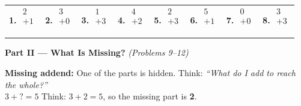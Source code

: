 \documentclass[12pt, letterpaper]{article}
\begin{document}
\noindent
\begin{tabular}{@{}p{1.8cm} p{1.8cm} p{1.8cm} p{1.8cm} p{1.8cm} p{1.8cm} p{1.8cm} p{1.8cm}@{}}

\textbf{1.}
$\begin{array}{r} 2 \\ +1 \\ \hline \phantom{0} \end{array}$
&
\textbf{2.}
$\begin{array}{r} 3 \\ +0 \\ \hline \phantom{0} \end{array}$
&
\textbf{3.}
$\begin{array}{r} 1 \\ +3 \\ \hline \phantom{0} \end{array}$
&
\textbf{4.}
$\begin{array}{r} 4 \\ +2 \\ \hline \phantom{0} \end{array}$
&
\textbf{5.}
$\begin{array}{r} 2 \\ +3 \\ \hline \phantom{0} \end{array}$
&
\textbf{6.}
$\begin{array}{r} 5 \\ +1 \\ \hline \phantom{0} \end{array}$
&
\textbf{7.}
$\begin{array}{r} 0 \\ +0 \\ \hline \phantom{0} \end{array}$
&
\textbf{8.}
$\begin{array}{r} 3 \\ +3 \\ \hline \phantom{0} \end{array}$

\end{tabular}

\bigskip\bigskip

\noindent\textcolor{scholared}{\large\textbf{Part II — What Is Missing?}} \hfill \textit{(Problems 9–12)}

\medskip

\begin{lessonbox}
\textbf{Missing addend:} One of the parts is hidden. Think: \textit{``What do I add to reach the whole?''}\\[4pt]
\hspace{2em} $3 + \boldsymbol{?} = 5$ \quad Think: $3 + 2 = 5$, so the missing part is \textbf{2}.
\end{lessonbox}
\end{document}
